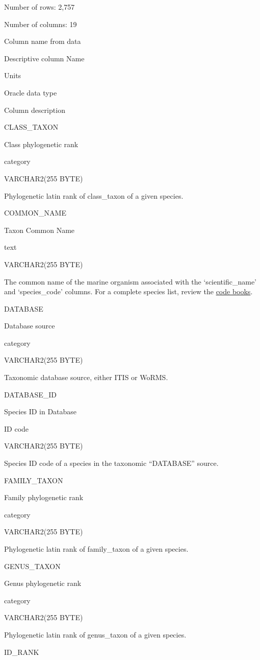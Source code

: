 \documentclass[
  letterpaper,
  oneside,
  open=any]{scrbook}
\begin{document}
Number of rows: 2,757

Number of columns: 19

Column name from data

Descriptive column Name

Units

Oracle data type

Column description

CLASS\_TAXON

Class phylogenetic rank

category

VARCHAR2(255 BYTE)

Phylogenetic latin rank of class\_taxon of a given species.

COMMON\_NAME

Taxon Common Name

text

VARCHAR2(255 BYTE)

The common name of the marine organism associated with the
`scientific\_name' and `species\_code' columns. For a complete species
list, review the
\href{https://www.fisheries.noaa.gov/resource/document/groundfish-survey-species-code-manual-and-data-codes-manual}{code
books}.

DATABASE

Database source

category

VARCHAR2(255 BYTE)

Taxonomic database source, either ITIS or WoRMS.

DATABASE\_ID

Species ID in Database

ID code

VARCHAR2(255 BYTE)

Species ID code of a species in the taxonomic ``DATABASE'' source.

FAMILY\_TAXON

Family phylogenetic rank

category

VARCHAR2(255 BYTE)

Phylogenetic latin rank of family\_taxon of a given species.

GENUS\_TAXON

Genus phylogenetic rank

category

VARCHAR2(255 BYTE)

Phylogenetic latin rank of genus\_taxon of a given species.

ID\_RANK
\end{document}

